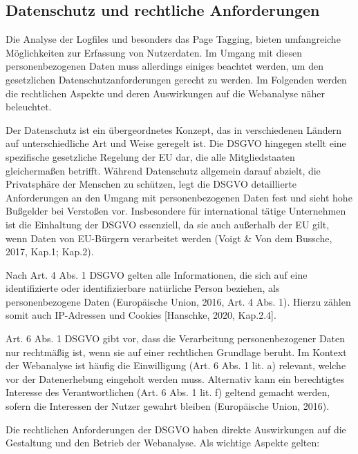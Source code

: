 \subsection{Datenschutz und rechtliche Anforderungen}
\label{sec:datenschutz}
Die Analyse der Logfiles und besonders das Page Tagging, bieten umfangreiche Möglichkeiten zur Erfassung von Nutzerdaten. Im Umgang mit diesen personenbezogenen Daten muss allerdings einiges beachtet werden, um den gesetzlichen Datenschutzanforderungen gerecht zu werden. Im Folgenden werden die rechtlichen Aspekte und deren Auswirkungen auf die Webanalyse näher beleuchtet.

Der Datenschutz ist ein übergeordnetes Konzept, das in verschiedenen Ländern auf unterschiedliche Art und Weise geregelt ist. Die DSGVO hingegen stellt eine spezifische gesetzliche Regelung der EU dar, die alle Mitgliedstaaten gleichermaßen betrifft. Während Datenschutz allgemein darauf abzielt, die Privatsphäre der Menschen zu schützen, legt die DSGVO detaillierte Anforderungen an den Umgang mit personenbezogenen Daten fest und sieht hohe Bußgelder bei Verstoßen vor. Insbesondere für international tätige Unternehmen ist die Einhaltung der DSGVO essenziell, da sie auch außerhalb der EU gilt, wenn Daten von EU-Bürgern verarbeitet werden (Voigt \& Von dem Bussche, 2017, Kap.1; Kap.2).

Nach Art. 4 Abs. 1 DSGVO gelten alle Informationen, die sich auf eine identifizierte oder identifizierbare natürliche Person beziehen, als personenbezogene Daten (Europäische Union, 2016, Art. 4 Abs. 1). Hierzu zählen somit auch IP-Adressen und Cookies [Hanschke, 2020, Kap.2.4].

Art. 6 Abs. 1 DSGVO gibt vor, dass die Verarbeitung personenbezogener Daten nur rechtmäßig ist, wenn sie auf einer rechtlichen Grundlage beruht. Im Kontext der Webanalyse ist häufig die Einwilligung (Art. 6 Abs. 1 lit. a) relevant, welche vor der Datenerhebung eingeholt werden muss. Alternativ kann ein berechtigtes Interesse des Verantwortlichen (Art. 6 Abs. 1 lit. f) geltend gemacht werden, sofern die Interessen der Nutzer gewahrt bleiben (Europäische Union, 2016).

Die rechtlichen Anforderungen der DSGVO haben direkte Auswirkungen auf die Gestaltung und den Betrieb der Webanalyse. Als wichtige Aspekte gelten: 

